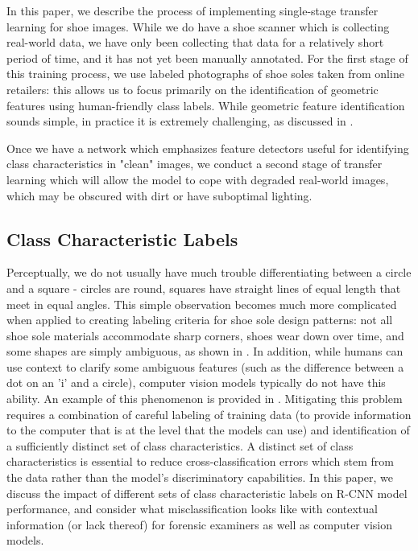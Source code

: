 \documentclass[10pt]{article}
\newcommand{\svp}[1]{{\textcolor{RedOrange}{#1}}}
\begin{document}
\svp{
In this paper, we describe the process of implementing single-stage transfer learning for shoe images.
While we do have a shoe scanner which is collecting real-world data, we have only been collecting that data for a relatively short period of time, and it has not yet been manually annotated.
For the first stage of this training process, we use labeled photographs of shoe soles taken from online retailers: this allows us to focus primarily on the identification of geometric features using human-friendly class labels.
While geometric feature identification sounds simple, in practice it is extremely challenging, as discussed in \Cref{sec:classification-scheme}.}


\svp{Once we have a network which emphasizes feature detectors useful for identifying class characteristics in "clean" images, we conduct a second stage of transfer learning which will allow the model to cope with degraded real-world images, which may be obscured with dirt or have suboptimal lighting.}

\subsection{Class Characteristic Labels}\label{sec:classification-scheme}
\svp{
Perceptually, we do not usually have much trouble differentiating between a circle and a square - circles are round, squares have straight lines of equal length that meet in equal angles.
This simple observation becomes much more complicated when applied to creating labeling criteria for shoe sole design patterns: not all shoe sole materials accommodate sharp corners, shoes wear down over time, and some shapes are simply ambiguous, as shown in  \Cref{fig:dc-shoe}.
In addition, while humans can use context to clarify some ambiguous features (such as the difference between a dot on an 'i' and a circle), computer vision models typically do not have this ability.
An example of this phenomenon is provided in \Cref{fig:adidas}.
Mitigating this problem requires a combination of careful labeling of training data (to provide information to the computer that is at the level that the models can use) and identification of a sufficiently distinct set of class characteristics.
A distinct set of class characteristics is essential to reduce cross-classification errors which stem from the data rather than the model's discriminatory capabilities.
In this paper, we discuss the impact of different sets of class characteristic labels on R-CNN model performance, and consider what misclassification looks like with contextual information (or lack thereof) for forensic examiners as well as computer vision models.
}
\end{document}
